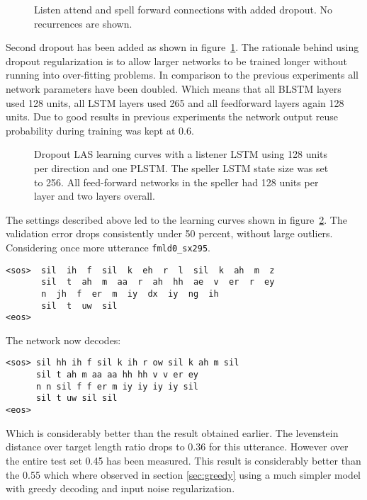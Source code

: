 \begin{figure}
\centering

\caption{Listen attend and spell forward connections with added dropout. No recurrences are shown.}
\label{fig:dropout}
\end{figure}
Second dropout has been added as shown in figure~\ref{fig:dropout}. The rationale behind using dropout regularization is to allow larger networks to be trained longer without running into over-fitting problems. In comparison to the previous experiments all network parameters have been doubled. Which means that all BLSTM layers used 128 units, all LSTM layers used 265 and all feedforward layers again 128 units. Due to good results in previous experiments the network output reuse probability during training was kept at 0.6. 
\begin{figure}


\caption{Dropout LAS learning curves with a listener LSTM using 128 units per direction and one PLSTM. The speller LSTM state size was set to 256. All feed-forward networks in the speller had 128 units per layer and two layers overall.}
\label{fig:dropBeamRes}
\end{figure}
The settings described above led to the learning curves shown in figure~\ref{fig:dropBeamRes}. The validation error drops consistently under 50 percent, without large outliers. Considering once more utterance \texttt{fmld0\_sx295}.
\begin{lstlisting}[caption={Targets}]
<sos>  sil  ih  f  sil  k  eh  r  l  sil  k  ah  m  z
       sil  t  ah  m  aa  r  ah  hh  ae  v  er  r  ey
       n  jh  f  er  m  iy  dx  iy  ng  ih  
       sil  t  uw  sil
<eos>
\end{lstlisting}
The network now decodes:
\begin{lstlisting}[caption={Network output}]
<sos> sil hh ih f sil k ih r ow sil k ah m sil 
	  sil t ah m aa aa hh hh v v er ey 
	  n n sil f f er m iy iy iy iy sil
	  sil t uw sil sil
<eos>
\end{lstlisting}
Which is considerably better than the result obtained earlier. The levenstein distance over target length ratio drops to 0.36 for this utterance. However over the entire test set 0.45 has been measured. This result is considerably better than the 0.55 which where observed in section \ref{sec:greedy} using a much simpler model with greedy decoding and input noise regularization.  


